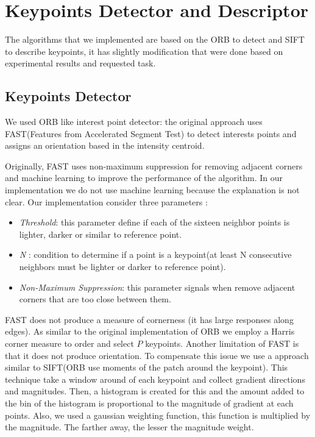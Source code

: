 \section{Keypoints Detector and Descriptor}

The algorithms that we implemented are based on the ORB to detect and SIFT to describe keypoints, it has slightly modification that were done based on experimental results and requested task.

\subsection{Keypoints Detector} 
We used ORB like interest point detector: the original approach uses FAST(Features from Accelerated Segment Test) to detect interests points and assigns an orientation based in the intensity centroid. 

Originally, FAST uses non-maximum suppression for removing adjacent corners and machine learning to improve the performance of the algorithm. In our implementation we do not use machine learning because the explanation is not clear. Our implementation consider three parameters : 

\begin{itemize}
	\item \textit{Threshold}: this parameter define if each of the sixteen neighbor points is lighter, darker or similar to reference point.
	\item \textit{N} : condition to determine if a point is a keypoint(at least N consecutive neighbors must be lighter or darker to reference point).
	\item \textit{Non-Maximum Suppression}: this parameter signals when remove adjacent corners that are too close between them.
\end{itemize}

FAST does not produce a measure of cornerness (it has large responses along edges). As similar to the original implementation of ORB we employ a Harris corner measure to order and select $P$ keypoints. Another limitation of FAST is that it does not produce orientation. To compensate this issue we use a approach similar to SIFT(ORB use moments of the patch around the keypoint). This technique take a window around of each keypoint and collect gradient directions and magnitudes. Then, a histogram is created for this and the amount added to the bin of the histogram is proportional to the magnitude of gradient at each points. Also, we used a gaussian weighting function, this function is multiplied by the magnitude. The farther away, the lesser the magnitude weight.

